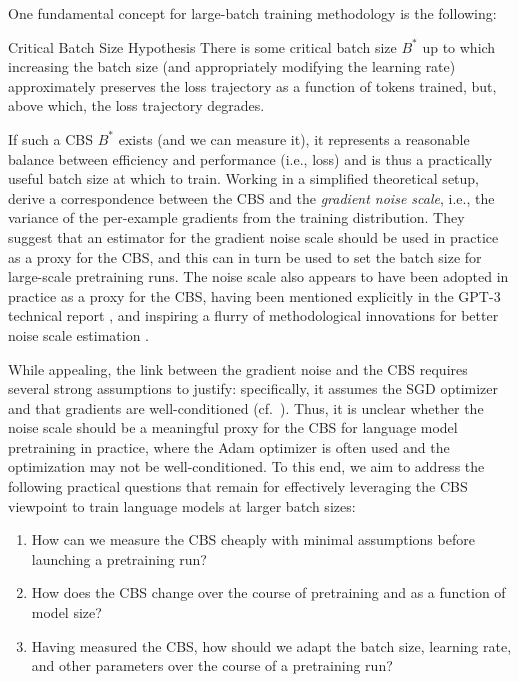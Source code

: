 \documentclass{article}
\begin{document}
One fundamental concept for large-batch training methodology is the following:

\begin{methodbox}{Critical Batch Size Hypothesis \citep{mccandlish2018empirical}}
There is some critical batch size $B^*$ up to which increasing the batch size (and appropriately modifying the  learning rate) approximately preserves the loss trajectory as a function of tokens trained, but, above which, the loss trajectory degrades.
\end{methodbox}

If such a CBS $B^*$ exists (and we can measure it), it represents a reasonable balance between efficiency and performance (i.e., loss) and is thus a practically useful batch size at which to train.
Working in a simplified theoretical setup, \citet{mccandlish2018empirical} derive a correspondence between the CBS and the \emph{gradient noise scale}, i.e., the variance of the per-example gradients from the training distribution.
They suggest that an estimator for the gradient noise scale should be used in practice as a proxy for the CBS, and this can in turn be used to set the batch size for large-scale pretraining runs.
The noise scale also appears to have been adopted in practice as a proxy for the CBS, having been mentioned explicitly in the GPT-3 technical report \citep{brown2020language}, and inspiring a flurry of methodological innovations for better noise scale estimation \citep{gray2023efficient,gray2024normalization}.

While appealing, the link between the gradient noise and the CBS requires several strong assumptions to justify: specifically, it assumes the SGD optimizer and that gradients are well-conditioned (cf.~).
Thus, it is unclear whether the noise scale should be a meaningful proxy for the CBS for language model pretraining in practice, where the Adam optimizer is often used and the optimization may not be well-conditioned.
To this end, we aim to address the following practical questions that remain for effectively leveraging the CBS viewpoint to train language models at larger batch sizes:

\begin{enumerate}
    \item How can we measure the CBS cheaply with minimal assumptions before launching a pretraining run?
    \item How does the CBS change over the course of pretraining and as a function of model size? 
    \item Having measured the CBS, how should we adapt the batch size, learning rate, and other parameters over the course of a pretraining run?
\end{enumerate}
\end{document}
